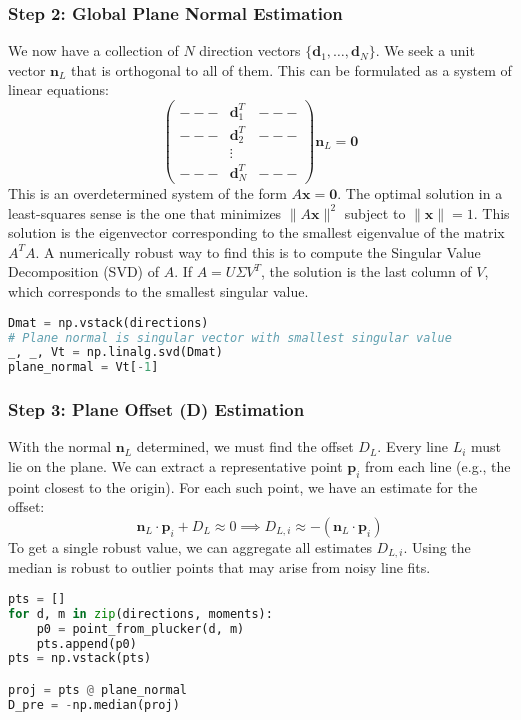 \documentclass{article}
\begin{document}
\subsubsection{Step 2: Global Plane Normal Estimation}
We now have a collection of $N$ direction vectors $\{\mathbf{d}_1, \dots, \mathbf{d}_N\}$. We seek a unit vector $\mathbf{n}_L$ that is orthogonal to all of them. This can be formulated as a system of linear equations:
\begin{equation}
\begin{pmatrix}
--- & \mathbf{d}_1^T & --- \\
--- & \mathbf{d}_2^T & --- \\
 & \vdots & \\
--- & \mathbf{d}_N^T & ---
\end{pmatrix}
\mathbf{n}_L = \mathbf{0}
\end{equation}
This is an overdetermined system of the form $A \mathbf{x} = \mathbf{0}$. The optimal solution in a least-squares sense is the one that minimizes $\|A \mathbf{x}\|^2$ subject to $\|\mathbf{x}\|=1$. This solution is the eigenvector corresponding to the smallest eigenvalue of the matrix $A^T A$. A numerically robust way to find this is to compute the Singular Value Decomposition (SVD) of $A$. If $A = U \Sigma V^T$, the solution is the last column of $V$, which corresponds to the smallest singular value.

\begin{lstlisting}[language=Python]
Dmat = np.vstack(directions)
# Plane normal is singular vector with smallest singular value
_, _, Vt = np.linalg.svd(Dmat)
plane_normal = Vt[-1]
\end{lstlisting}

\subsubsection{Step 3: Plane Offset (D) Estimation}
With the normal $\mathbf{n}_L$ determined, we must find the offset $D_L$. Every line $L_i$ must lie on the plane. We can extract a representative point $\mathbf{p}_i$ from each line (e.g., the point closest to the origin). For each such point, we have an estimate for the offset:
\begin{equation}
\mathbf{n}_L \cdot \mathbf{p}_i + D_L \approx 0 \implies D_{L,i} \approx -(\mathbf{n}_L \cdot \mathbf{p}_i)
\end{equation}
To get a single robust value, we can aggregate all estimates $D_{L,i}$. Using the median is robust to outlier points that may arise from noisy line fits.
\begin{lstlisting}[language=Python]
pts = []
for d, m in zip(directions, moments):
    p0 = point_from_plucker(d, m)
    pts.append(p0)
pts = np.vstack(pts)

proj = pts @ plane_normal
D_pre = -np.median(proj)
\end{lstlisting}
\end{document}
